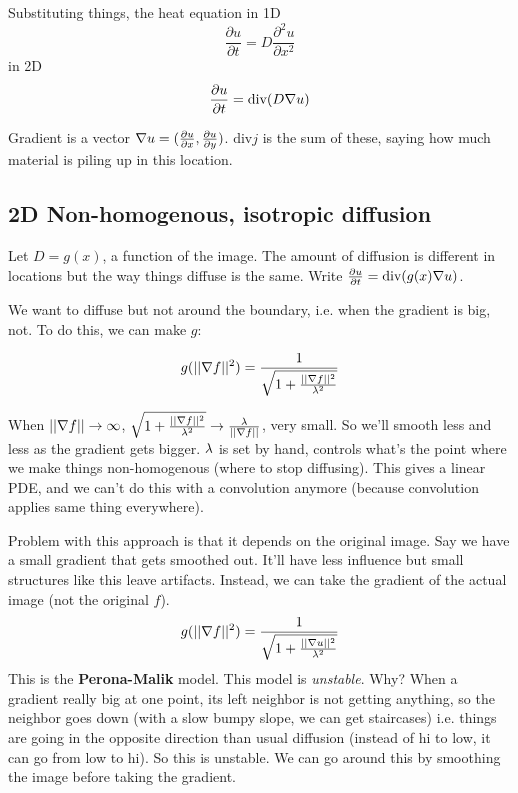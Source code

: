 Substituting things, the heat equation in 1D $$\frac{\partial u}{\partial t} = D \frac{\partial^2 u}{\partial
  x^2} $$
in 2D $$\frac{\partial u}{\partial t} = \text{div}(D \nabla u) $$

Gradient is a vector $\nabla u = (\frac{\partial u}{\partial x} ,
\frac{\partial u}{\partial y} )$. $\text{div} j$ is the sum of these, saying
how much material is piling up in this location.

\subsection{2D Non-homogenous, isotropic diffusion}
\label{sec:non-homog-isotr}
Let $D=g(x)$, a function of the image. The amount of diffusion is
different in locations but the way things diffuse is the same. Write
$\frac{\partial u}{\partial t} = \text{div}(g(x) \nabla u) $.

We want to diffuse but not around the boundary, i.e. when the gradient
is big, not. To do this, we can
make $g$:

$$g(||\nabla f||^2) = \frac{1}{\sqrt{1 + \frac{||\nabla f||^2}{\lambda^2}}}$$

When $||\nabla f|| \rightarrow \infty$, $\sqrt{1 + \frac{||\nabla
    f||^2}{\lambda^2}} \rightarrow \frac{\lambda}{||\nabla f||}$, very small. So
we'll smooth less and less as the gradient gets bigger.
$\lambda$ is set by hand, controls what's the point where we make things
non-homogenous (where to stop diffusing). This gives a linear PDE, and
we can't do this with a convolution anymore (because convolution
applies same thing everywhere).

Problem with this approach is that it depends on the original
image. Say we have a small gradient that gets smoothed out. It'll have
less influence but small structures like this leave
artifacts. Instead, we can take the gradient of the actual image (not
the original $f$).
\begin{equation}
g(||\nabla f||^2) = \frac{1}{\sqrt{1 + \frac{||\nabla u||^2}{\lambda^2}}}\label{eq:25}
\end{equation}
This is the \textbf{Perona-Malik} model. This model is \emph{unstable}. Why?
When a gradient really big at one point, its left neighbor is not getting
anything, so the neighbor goes down (with a slow bumpy slope, we can
get staircases) i.e. things are going in the opposite direction than usual
diffusion (instead of hi to low, it can go from low to hi). So this is
unstable. We can go around this by smoothing the image before taking the
gradient. 

